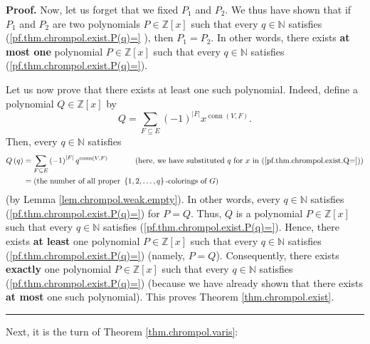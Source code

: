 \documentclass[numbers=enddot,12pt,final,onecolumn,notitlepage]{scrartcl}%
\theoremstyle{definition}
\newenvironment{proof}[1][Proof]{\noindent\textbf{#1.} }{\ \rule{0.5em}{0.5em}}
\newenvironment{verlong}{}{}
\let\sumnonlimits\sum
\renewcommand{\sum}{\sumnonlimits\limits}
\begin{document}
\begin{verlong}
\begin{proof}
Now, let us forget that we fixed $P_{1}$ and $P_{2}$. We thus have shown that
if $P_{1}$ and $P_{2}$ are two polynomials $P\in\mathbb{Z}\left[  x\right]  $
such that every $q\in\mathbb{N}$ satisfies (\ref{pf.thm.chrompol.exist.P(q)=}%
), then $P_{1}=P_{2}$. In other words, there exists \textbf{at most one}
polynomial $P\in\mathbb{Z}\left[  x\right]  $ such that every $q\in\mathbb{N}$
satisfies (\ref{pf.thm.chrompol.exist.P(q)=}).

Let us now prove that there exists at least one such polynomial. Indeed,
define a polynomial $Q\in\mathbb{Z}\left[  x\right]  $ by%
\begin{equation}
Q=\sum_{F\subseteq E}\left(  -1\right)  ^{\left\vert F\right\vert
}x^{\operatorname*{conn}\left(  V,F\right)  }.
\label{pf.thm.chrompol.exist.Q=}%
\end{equation}
Then, every $q\in\mathbb{N}$ satisfies%
\begin{align*}
Q\left(  q\right)   &  =\sum_{F\subseteq E}\left(  -1\right)  ^{\left\vert
F\right\vert }q^{\operatorname*{conn}\left(  V,F\right)  }%
\ \ \ \ \ \ \ \ \ \ \left(  \text{here, we have substituted }q\text{ for
}x\text{ in (\ref{pf.thm.chrompol.exist.Q=})}\right) \\
&  =\left(  \text{the number of all proper }\left\{  1,2,\ldots,q\right\}
\text{-colorings of }G\right)
\end{align*}
(by Lemma \ref{lem.chrompol.weak.empty}). In other words, every $q\in
\mathbb{N}$ satisfies (\ref{pf.thm.chrompol.exist.P(q)=}) for $P=Q$. Thus, $Q$
is a polynomial $P\in\mathbb{Z}\left[  x\right]  $ such that every
$q\in\mathbb{N}$ satisfies (\ref{pf.thm.chrompol.exist.P(q)=}). Hence, there
exists \textbf{at least} one polynomial $P\in\mathbb{Z}\left[  x\right]  $
such that every $q\in\mathbb{N}$ satisfies (\ref{pf.thm.chrompol.exist.P(q)=})
(namely, $P=Q$). Consequently, there exists \textbf{exactly} one polynomial
$P\in\mathbb{Z}\left[  x\right]  $ such that every $q\in\mathbb{N}$ satisfies
(\ref{pf.thm.chrompol.exist.P(q)=}) (because we have already shown that there
exists \textbf{at most} one such polynomial). This proves Theorem
\ref{thm.chrompol.exist}.
\end{proof}
\end{verlong}

Next, it is the turn of Theorem \ref{thm.chrompol.varis}:
\end{document}
